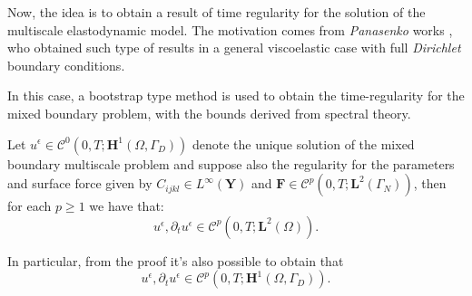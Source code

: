 
Now, the idea is to obtain a result of time regularity for the solution of the multiscale elastodynamic model. The motivation comes from \textit{Panasenko} works \cite{panasenko2005multi-scale}, who obtained such type of results in a general viscoelastic case with full \textit{Dirichlet} boundary conditions.

In this case, a bootstrap type method is used to obtain the time-regularity for the mixed boundary problem, with the bounds derived from spectral theory.

\begin{prop}
\label{BootstrapingProp}
Let $u^{\epsilon} \in \mathcal{C}^{0}(0,T; \mathbf{H}^1(\Omega, \Gamma_D))$ denote the unique solution of the mixed boundary multiscale problem and suppose also the regularity for the parameters and surface force given by $C_{ijkl} \in L^{\infty}(\mathbf{Y})$ and $\mathbf{F} \in \mathcal{C}^p(0,T; \mathbf{L}^{2}(\Gamma_N))$, then for each $p \geq 1$ we have that:
\begin{equation*}
    u^{\epsilon}, \partial_t u^{\epsilon} \in \mathcal{C}^p(0,T; \mathbf{L}^2(\Omega)).
\end{equation*}
\end{prop}
\begin{rem}
In particular, from the proof it's also possible to obtain that
\begin{equation*}
    u^{\epsilon}, \partial_t u^{\epsilon} \in \mathcal{C}^p(0,T; \mathbf{H}^1(\Omega, \Gamma_D)).
\end{equation*}
\end{rem}

